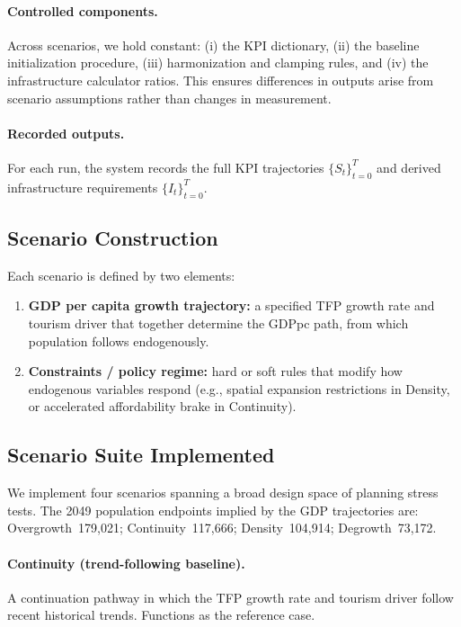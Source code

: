 \documentclass{article}
\begin{document}
\paragraph{Controlled components.}
Across scenarios, we hold constant: (i) the KPI dictionary, (ii) the baseline
initialization procedure, (iii) harmonization and clamping rules, and (iv) the
infrastructure calculator ratios. This ensures differences in outputs arise from scenario
assumptions rather than changes in measurement.

\paragraph{Recorded outputs.}
For each run, the system records the full KPI trajectories $\{S_t\}_{t=0}^{T}$ and
derived infrastructure requirements $\{I_t\}_{t=0}^{T}$.

\subsection{Scenario Construction}
\label{subsec:scenario_construction}

Each scenario is defined by two elements:
\begin{enumerate}
    \item \textbf{GDP per capita growth trajectory:} a specified TFP growth rate
          and tourism driver that together determine the GDPpc path, from which
          population follows endogenously.
    \item \textbf{Constraints / policy regime:} hard or soft rules that modify
          how endogenous variables respond (e.g., spatial expansion restrictions
          in Density, or accelerated affordability brake in Continuity).
\end{enumerate}

\subsection{Scenario Suite Implemented}
\label{subsec:scenario_suite}

We implement four scenarios spanning a broad design space of planning stress
tests. The 2049 population endpoints implied by the GDP trajectories are:
Overgrowth~179{,}021; Continuity~117{,}666; Density~104{,}914;
Degrowth~73{,}172.

\paragraph{Continuity (trend-following baseline).}
A continuation pathway in which the TFP growth rate and tourism driver follow
recent historical trends. Functions as the reference case.
\end{document}
